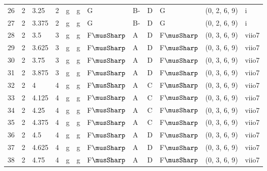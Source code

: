\begin{tabular}{llllllllllll}
26  & 2       & 3.25   & 2               & g          & g              & G      & B-      & D      & G         & (0, 2, 6, 9)     & i              \\
27  & 2       & 3.375  & 2               & g          & g              & G      & B-      & D      & G         & (0, 2, 6, 9)     & i              \\
28  & 2       & 3.5    & 3               & g          & g              & F$\musSharp$     & A       & D      & F$\musSharp$        & (0, 3, 6, 9)     & viio7          \\
29  & 2       & 3.625  & 3               & g          & g              & F$\musSharp$     & A       & D      & F$\musSharp$        & (0, 3, 6, 9)     & viio7          \\
30  & 2       & 3.75   & 3               & g          & g              & F$\musSharp$     & A       & D      & F$\musSharp$        & (0, 3, 6, 9)     & viio7          \\
31  & 2       & 3.875  & 3               & g          & g              & F$\musSharp$     & A       & D      & F$\musSharp$        & (0, 3, 6, 9)     & viio7          \\
32  & 2       & 4      & 4               & g          & g              & F$\musSharp$     & A       & C      & F$\musSharp$        & (0, 3, 6, 9)     & viio7          \\
33  & 2       & 4.125  & 4               & g          & g              & F$\musSharp$     & A       & C      & F$\musSharp$        & (0, 3, 6, 9)     & viio7          \\
34  & 2       & 4.25   & 4               & g          & g              & F$\musSharp$     & A       & C      & F$\musSharp$        & (0, 3, 6, 9)     & viio7          \\
35  & 2       & 4.375  & 4               & g          & g              & F$\musSharp$     & A       & C      & F$\musSharp$        & (0, 3, 6, 9)     & viio7          \\
36  & 2       & 4.5    & 4               & g          & g              & F$\musSharp$     & A       & D      & F$\musSharp$        & (0, 3, 6, 9)     & viio7          \\
37  & 2       & 4.625  & 4               & g          & g              & F$\musSharp$     & A       & D      & F$\musSharp$        & (0, 3, 6, 9)     & viio7          \\
38  & 2       & 4.75   & 4               & g          & g              & F$\musSharp$     & A       & D      & F$\musSharp$        & (0, 3, 6, 9)     & viio7          \\

\end{tabular}
